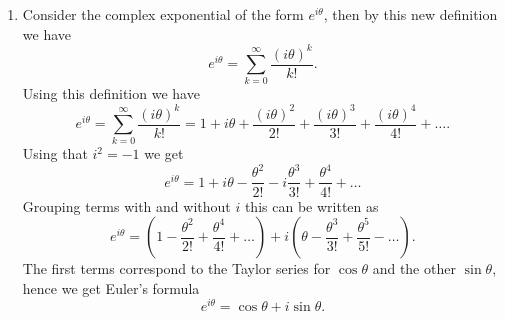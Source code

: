 \begin{enumerate}
\item Consider the complex exponential of the form $e^{i\theta}$, then by this new definition we have
$$e^{i\theta}=\sum_{k=0}^{\infty}\frac{(i\theta)^{k}}{k!}.$$
Using this definition we have
$$e^{i\theta}=\sum_{k=0}^{\infty}\frac{(i\theta)^{k}}{k!}=1+i\theta+\frac{(i\theta)^{2}}{2!}+\frac{(i\theta)^{3}}{3!}+\frac{(i\theta)^{4}}{4!}+\hdots.$$
Using that $i^{2}=-1$ we get
$$e^{i\theta}=1+i\theta-\frac{\theta^{2}}{2!}-i\frac{\theta^{3}}{3!}+\frac{\theta^{4}}{4!}+\hdots$$
Grouping terms with and without $i$ this can be written as
$$e^{i\theta}=(1-\frac{\theta^{2}}{2!}+\frac{\theta^{4}}{4!}+\hdots)+i(\theta-\frac{\theta^{3}}{3!}+\frac{\theta^{5}}{5!}-\hdots).$$
The first terms correspond to the Taylor series for $\cos \theta$ and the other $\sin \theta$, hence we get Euler's formula
$$e^{i\theta}=\cos\theta+i\sin\theta.$$

\end{enumerate}